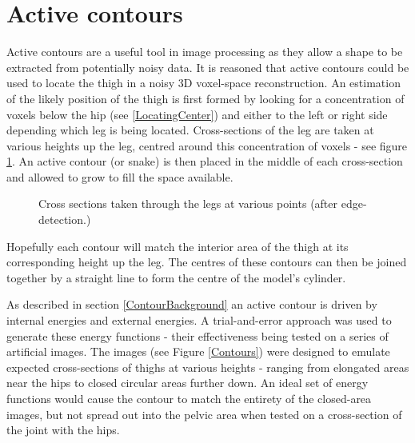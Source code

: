 \section{Active contours}

Active contours are a useful tool in image processing as they allow a shape to be extracted from potentially noisy data.
It is reasoned that active contours could be used to locate the thigh in a noisy 3D voxel-space reconstruction.
An estimation of the likely position of the thigh is first formed by looking for a concentration of voxels below the hip
(see \ref{LocatingCenter}) and either to the left or right side depending which leg is being located.
Cross-sections of the leg are taken at various heights up the leg, centred around this concentration of voxels - see figure \ref{CrossSections}.
An active contour (or snake) is then placed in the middle of each cross-section and allowed to grow to fill the space available.

\begin{figure}[tb]
	\vspace{-10pt}
	\centering
	\quad
	\caption{Cross sections taken through the legs at various points (after edge-detection.)}
	\label{CrossSections}
\end{figure}

Hopefully each contour will match the interior area of the thigh at its corresponding height up the leg.
The centres of these contours can then be joined together by a straight line to form the centre of the model's cylinder.

As described in section \ref{ContourBackground} an active contour is driven by internal energies and external energies.
A trial-and-error approach was used to generate these energy functions - their effectiveness being tested on a series of artificial images.
The images (see Figure \ref{Contours}) were designed to emulate expected cross-sections of thighs at various heights - ranging from elongated areas
near the hips to closed circular areas further down.
An ideal set of energy functions would cause the contour to match the entirety of the closed-area images, but not spread out into
the pelvic area when tested on a cross-section of the joint with the hips.

